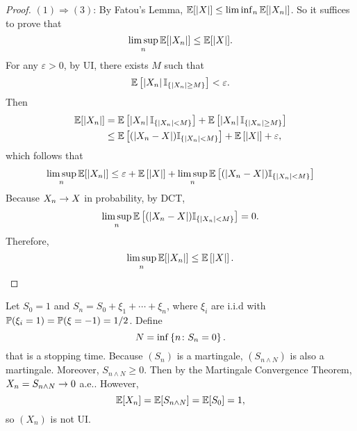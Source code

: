 \begin{proof}
    \noindent $(1) \Rightarrow (3)$: By Fatou's Lemma, $\mathbb{E}[\left\lvert X\right\lvert] \leq \liminf_n \mathbb{E}[\left\lvert X_n\right\lvert]$. So it suffices to prove that
    \begin{equation*}
        \limsup_n \mathbb{E}[\left\lvert X_n\right\lvert] \leq \mathbb{E}[\left\lvert X\right\lvert].
    \end{equation*}
    For any $\varepsilon > 0$, by UI, there exists $M$ such that
    \begin{equation*}
        \mathbb{E}\left[\left\lvert X_n\right\lvert\mathbb{I}_{\left\{\left\lvert X_n\right\lvert \geq M\right\}}\right] < \varepsilon.
    \end{equation*}
    Then
    \begin{equation*}
        \begin{aligned}
            \mathbb{E}[\left\lvert X_n\right\lvert] &= \mathbb{E}\left[\left\lvert X_n\right\lvert\mathbb{I}_{\left\{\left\lvert X_n\right\lvert < M\right\}}\right] + \mathbb{E}\left[\left\lvert X_n\right\lvert\mathbb{I}_{\left\{\left\lvert X_n\right\lvert \geq M\right\}}\right] \\
            &\leq \mathbb{E}\left[(\left\lvert X_n-X\right\lvert)\mathbb{I}_{\left\{\left\lvert X_n\right\lvert < M\right\}}\right] + \mathbb{E}\left[\left\lvert X\right\lvert\right] + \varepsilon,
        \end{aligned}
    \end{equation*}
    which follows that
    \begin{equation*}
        \limsup_n \mathbb{E}[\left\lvert X_n\right\lvert] \leq \varepsilon + \mathbb{E}\left[\left\lvert X\right\lvert\right] + \limsup_n \mathbb{E}\left[(\left\lvert X_n-X\right\lvert)\mathbb{I}_{\left\{\left\lvert X_n\right\lvert < M\right\}}\right]
    \end{equation*}
    Because $X_n \rightarrow X$ in probability, by DCT,
    \begin{equation*}
         \limsup_n \mathbb{E}\left[(\left\lvert X_n-X\right\lvert)\mathbb{I}_{\left\{\left\lvert X_n\right\lvert < M\right\}}\right] = 0.
    \end{equation*}
    Therefore,
    \begin{equation*}
        \limsup_n \mathbb{E}[\left\lvert X_n\right\lvert] \leq \mathbb{E}\left[\left\lvert X\right\lvert\right]. \qedhere
    \end{equation*}
\end{proof}

\begin{exam}
    Let $S_0 = 1$ and $S_n = S_0 + \xi_1+\cdots+\xi_n$, where $\xi_i$ are i.i.d with $\mathbb{P}(\xi_i = 1) = \mathbb{P}(\xi=-1) = 1/2$. Define
    \begin{equation*}
        N = \inf\left\{ n \colon S_n = 0 \right\}.
    \end{equation*}
    that is a stopping time. Because $(S_n)$ is a martingale, $(S_{n \wedge N})$ is also a martingale. Moreover, $S_{n \wedge N} \geq 0$. Then by the Martingale Convergence Theorem, $X_n = S_{n \wedge N} \rightarrow 0$ a.e.. However, 
    \begin{equation*}
        \mathbb{E}[X_n] = \mathbb{E}[S_{n \wedge N}] = \mathbb{E}[S_0] = 1,
    \end{equation*}
    so $(X_n)$ is not UI.
\end{exam}

